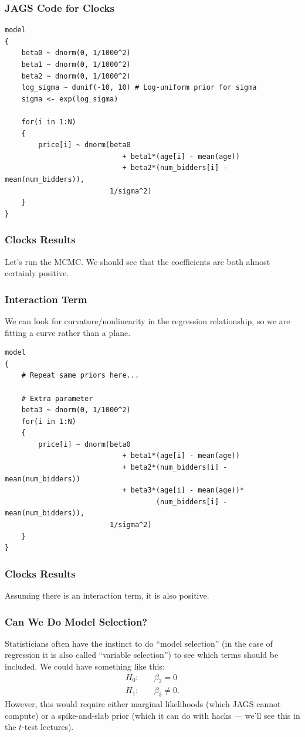 \documentclass{beamer}
\begin{document}
\begin{frame}[fragile]
\frametitle{JAGS Code for Clocks}
\tiny

\begin{verbatim}
model
{
    beta0 ~ dnorm(0, 1/1000^2)
    beta1 ~ dnorm(0, 1/1000^2)
    beta2 ~ dnorm(0, 1/1000^2)
    log_sigma ~ dunif(-10, 10) # Log-uniform prior for sigma
    sigma <- exp(log_sigma)

    for(i in 1:N)
    {
        price[i] ~ dnorm(beta0
                            + beta1*(age[i] - mean(age))
                            + beta2*(num_bidders[i] - mean(num_bidders)),
                         1/sigma^2)
    }
}
\end{verbatim}

\end{frame}


\begin{frame}[fragile]
\frametitle{Clocks Results}
Let's run the MCMC. We should see that the coefficients are both
almost certainly positive.

\end{frame}


\begin{frame}[fragile]
\frametitle{Interaction Term}
We can look for curvature/nonlinearity in the regression relationship,
so we are fitting a curve rather than a plane.
\tiny
\begin{verbatim}
model
{
    # Repeat same priors here...

    # Extra parameter
    beta3 ~ dnorm(0, 1/1000^2)
    for(i in 1:N)
    {
        price[i] ~ dnorm(beta0
                            + beta1*(age[i] - mean(age))
                            + beta2*(num_bidders[i] - mean(num_bidders))
                            + beta3*(age[i] - mean(age))*
                                    (num_bidders[i] - mean(num_bidders)),
                         1/sigma^2)
    }
}
\end{verbatim}

\end{frame}


\begin{frame}[fragile]
\frametitle{Clocks Results}
Assuming there is an interaction term, it is also positive.

\end{frame}



\begin{frame}[fragile]
\frametitle{Can We Do Model Selection?}
Statisticians often have the instinct to do ``model selection'' (in the case
of regression it is also called ``variable selection'') to see which terms
should be included. We could have something like this:
\begin{align}
H_0:\quad& \beta_3 = 0 \\
H_1:\quad& \beta_3 \neq 0.
\end{align}
\pause
However, this would require either marginal likelihoods (which JAGS cannot
compute) or a spike-and-slab prior (which it can do with hacks --- we'll
see this in the $t$-test lectures).
\end{frame}
\end{document}
